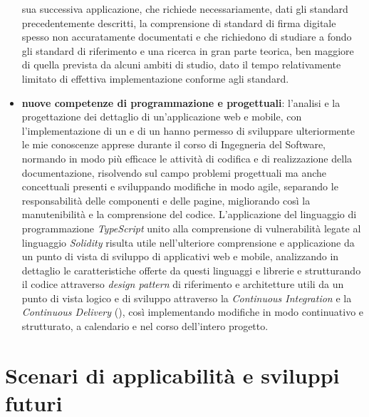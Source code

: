 \begin{itemize}[noitemsep,topsep=2pt]
    sua successiva applicazione, che richiede necessariamente, dati gli standard precedentemente descritti, la comprensione di standard di firma digitale spesso non accuratamente documentati e che richiedono di studiare a fondo gli standard di riferimento e una ricerca
    in gran parte teorica, ben maggiore di quella prevista da alcuni ambiti di studio, dato il tempo relativamente limitato di effettiva implementazione conforme agli standard.
    \item \textbf{nuove competenze di programmazione e progettuali}: l'analisi e la progettazione dei dettaglio di un'applicazione web e mobile, con l'implementazione di un  e di un  hanno permesso di sviluppare ulteriormente le mie conoscenze apprese durante il corso di Ingegneria
    del Software, normando in modo più efficace le attività di codifica e di realizzazione della documentazione, risolvendo sul campo problemi progettuali ma anche concettuali presenti e sviluppando modifiche in modo agile, separando le responsabilità delle componenti e delle pagine, 
    migliorando così la manutenibilità e la comprensione del codice. 
    L'applicazione del linguaggio di programmazione \textit{TypeScript} unito alla comprensione di vulnerabilità legate al linguaggio \textit{Solidity} risulta utile nell'ulteriore comprensione e applicazione da un punto di vista di sviluppo di applicativi web e mobile, 
    analizzando in dettaglio le caratteristiche offerte da questi linguaggi e librerie e strutturando il codice attraverso \textit{design pattern} di riferimento e architetture utili da un punto di vista logico e di sviluppo attraverso la \textit{Continuous Integration} e la \textit{Continuous Delivery} (\cite{site:cicd}), così implementando modifiche in modo continuativo 
    e strutturato, a calendario e nel corso dell'intero progetto. 
\end{itemize}

\section{Scenari di applicabilità e sviluppi futuri}\label{sec:conclusioni-conoscenze-sviluppi}

